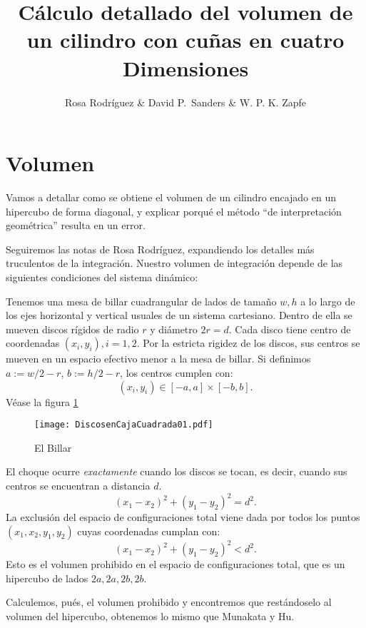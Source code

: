 \documentclass[a4paper,10pt]{article}
\title{Cálculo detallado del volumen de un cilindro con cuñas en cuatro
Dimensiones}
\author{Rosa Rodríguez \& David P.~Sanders \& W. P. K. Zapfe}
\begin{document}
\maketitle

\section{Volumen}

Vamos a detallar como  se obtiene el volumen de un cilindro
encajado en un hipercubo de forma diagonal, y explicar porqué el 
método ``de interpretación geométrica'' resulta en un error. 

Seguiremos las notas de Rosa Rodríguez, expandiendo los detalles
más truculentos de la integración. Nuestro volumen de integración
depende de las siguientes condiciones del sistema dinámico:

Tenemos una mesa de billar cuadrangular de lados de tamaño 
$w,h$ a lo largo de los ejes horizontal y vertical usuales
de un sistema cartesiano. Dentro de ella se mueven
discos rígidos de radio $r$ y diámetro $2r=d$.  Cada disco
tiene centro de coordenadas $(x_i, y_i), i=1,2$. Por la
estricta rigidez de los discos, sus centros se mueven
en un espacio efectivo menor a la mesa de billar. Si definimos
$a:=w/2-r$, $b:=h/2-r$, los centros cumplen con:
\begin{equation}
(x_i, y_i)\in [-a,a]\times [-b,b].
\end{equation}
Véase la figura \ref{Billar01}

\begin{figure}[h]
  \centering
  \texttt{[image: DiscosenCajaCuadrada01.pdf]}
  \caption{El Billar}\label{Billar01}
\end{figure}

El choque ocurre \emph{exactamente} cuando los discos se tocan,
es decir, cuando sus centros se encuentran a distancia $d$. 
\begin{equation}\label{condencuentro}
(x_1-x_2)^2+(y_1-y_2)^2=d^2.
\end{equation}
La exclusión del espacio de configuraciones total
viene dada por todos los puntos $(x_1,x_2,y_1,y_2)$ cuyas
coordenadas cumplan con:
\begin{equation}
(x_1-x_2)^2+(y_1-y_2)^2<d^2.
\end{equation}
Esto es el volumen prohibido en el espacio de configuraciones
total, que es un hipercubo de lados $2a,2a, 2b, 2b$. 

Calculemos, pués, el volumen prohibido y encontremos que restándoselo
al volumen del hipercubo, obtenemos lo mismo que Munakata y Hu. 
\end{document}
